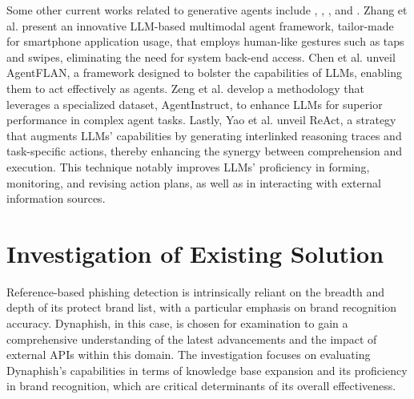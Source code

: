 Some other current works related to generative agents include \cite{yang2023appagent}, \cite{chen2024agent}, \cite{zeng2023agenttuning}, and \cite{yao2022react}. Zhang et al.\cite{yang2023appagent} present an innovative LLM-based multimodal agent framework, tailor-made for smartphone application usage, that employs human-like gestures such as taps and swipes, eliminating the need for system back-end access. Chen et al.\cite{chen2024agent} unveil AgentFLAN, a framework designed to bolster the capabilities of LLMs, enabling them to act effectively as agents. Zeng et al.\cite{zeng2023agenttuning} develop a methodology that leverages a specialized dataset, AgentInstruct, to enhance LLMs for superior performance in complex agent tasks. Lastly, Yao et al.\cite{yao2022react} unveil ReAct, a strategy that augments LLMs' capabilities by generating interlinked reasoning traces and task-specific actions, thereby enhancing the synergy between comprehension and execution. This technique notably improves LLMs' proficiency in forming, monitoring, and revising action plans, as well as in interacting with external information sources.

\section{Investigation of Existing Solution}

Reference-based phishing detection is intrinsically reliant on the breadth and depth of its protect brand list, with a particular emphasis on brand recognition accuracy. Dynaphish, in this case, is chosen for examination to gain a comprehensive understanding of the latest advancements and the impact of external APIs within this domain. The investigation focuses on evaluating Dynaphish's capabilities in terms of knowledge base expansion and its proficiency in brand recognition, which are critical determinants of its overall effectiveness.



